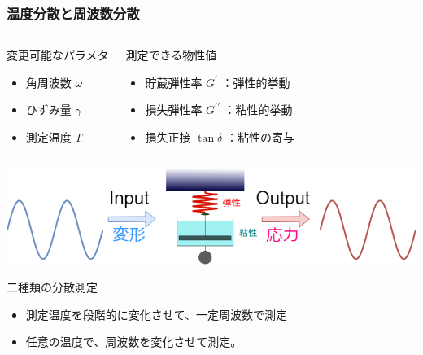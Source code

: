 \documentclass[12pt, dvipdfmx]{beamer}
\begin{document}
\begin{frame}
	\frametitle{温度分散と周波数分散}
		\vspace{-5mm}
	\begin{columns}[T, onlytextwidth]
			\begin{exampleblock}{変更可能なパラメタ}
				\begin{itemize}
				\item 角周波数 $\omega$
				\item ひずみ量 $\gamma$
				\item 測定温度 $T$
				\end{itemize}
			\end{exampleblock}
			\begin{block}{測定できる物性値}
				\begin{itemize}
				\item 貯蔵弾性率 $G^{\prime}$ ：弾性的挙動
				\item 損失弾性率 $G^{\prime \prime}$ ：粘性的挙動
				\item 損失正接 $\tan \delta$ ：粘性の寄与
				\end{itemize}
			\end{block}
	\end{columns}

		\vspace{3mm}
			\centering
				\includegraphics[width=.9\textwidth]{dynamic_ViscoElast_2.png}
		
	\begin{alertblock}{二種類の分散測定}
		\begin{itemize}
			\item 測定温度を段階的に変化させて、一定周波数で測定
			\item 任意の温度で、周波数を変化させて測定。
		\end{itemize}
	\end{alertblock}
\end{frame}
\end{document}
